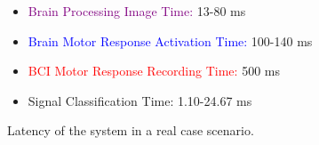 \begin{figure}[!htbp]
{
    }
    \begin{itemize}
        \item \textcolor{purple}{Brain Processing Image Time:} 13-80 ms
        \item \textcolor{blue}{Brain Motor Response Activation Time:} 100-140 ms
        \item \textcolor{red}{BCI Motor Response Recording Time:} 500 ms
        \item \textcolor{amethyst}{Signal Classification Time:} 1.10-24.67 ms
    \end{itemize}
    \caption{Latency of the system in a real case scenario.}\label{fig:latency}
\end{figure}

